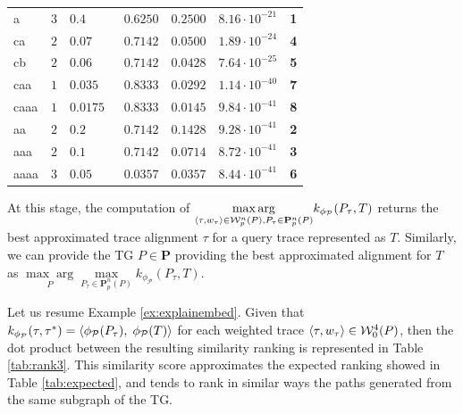\begin{table}[!t]
\begin{tabular}{lc|ll|cc|l}
		\midrule
		{a}  & $3$ & $0.4$ & $\;\; 0.6250$  & $0.2500$ & $8.16\cdot 10^{-21}$ & \textbf{\color{blue}1}\\
		{ca}  & $2$ & $0.07$ & $\;\; 0.7142$ & $0.0500$ & $1.89\cdot 10^{-24}$ & \textbf{\color{blue}4}\\
		{cb}  & $2$ & $0.06$ & $\;\; 0.7142$ & $0.0428$ & $7.64\cdot 10^{-25}$ & \textbf{\color{blue}5}\\
		{caa}  & $1$ & $0.035$ & $\;\; 0.8333$ & $0.0292$ & $1.14\cdot 10^{-40}$ & \textbf{\color{blue}7}\\
		{caaa}  & $1$  & $0.0175$ & $\;\; 0.8333$ & $0.0145$ & $9.84\cdot 10^{-41}$ & \textbf{\color{blue}8}\\
		{aa}  & $2$ & $0.2$ & $\;\; 0.7142$ & $0.1428$ & $9.28\cdot 10^{-41}$ & \textbf{\color{red}2}\\
		{aaa}  & $2$ & $0.1$ & $\;\; 0.7142$ & $0.0714$ & $8.72\cdot 10^{-41}$ & \textbf{\color{red}3}\\
		{aaaa}  & $3$ & $0.05$ & $\;\; 0.0357$ & $0.0357$ & $8.44\cdot 10^{-41}$ & \textbf{\color{red}6}\\
		\bottomrule
	\end{tabular}
\end{table}


At this stage, the computation of $\underset{\braket{\tau,w_\tau}\in \mathcal{W}_p^n(P), P_\tau\in\mathbf{P}_p^n(P)}{\max\arg} k_{\phi_\mathcal{P}}(P_\tau, T)$ returns the best approximated trace alignment $\tau$ for a query trace represented as $T$. Similarly, we can provide the TG $P\in\mathbf{P}$ providing the best approximated alignment for $T$ as $\underset{P}{\max\arg}\underset{ P_\tau\in\mathbf{P}_p^n(P)}{\max} k_{\phi_\mathcal{P}}(P_\tau, T)$.

\begin{example}
	Let us resume Example \ref{ex:explainembed}.
	Given that $k_{\phi_{\mathcal{P}}}(\tau,\tau^*)=\braket{\phi_{\mathcal{P}}(P_\tau),\;\phi_{\mathcal{P}}(T)}$ for each weighted trace $\braket{\tau,w_\tau}\in\mathcal{W}_0^4(P)$, then the dot product between the resulting similarity ranking is represented in Table \ref{tab:rank3}. This similarity score approximates the expected ranking showed in Table \ref{tab:expected}, and tends to rank in similar ways the paths generated from the same subgraph of the TG.
\end{example}


